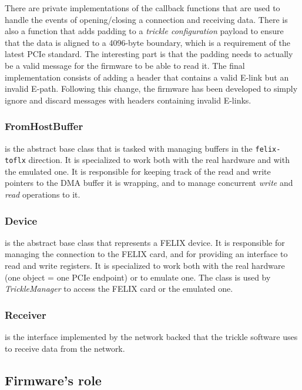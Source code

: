 There are private implementations of the callback functions that are used to handle the events of opening/closing a connection and receiving data. There is also a function that adds padding to a \emph{trickle configuration} payload to ensure that the data is aligned to a 4096-byte boundary, which is a requirement of the latest \acs{PCIe} standard. The interesting part is that the padding needs to actually be a valid message for the firmware to be able to read it. The final implementation consists of adding a header that contains a valid \acs{E-link} but an invalid E-path. Following this change, the firmware has been developed to simply ignore and discard messages with headers containing invalid \acs{E-link}s.

\subsubsection{FromHostBuffer} is the abstract base class that is tasked with managing buffers in the \texttt{felix-toflx} direction. It is specialized to work both with the real hardware and with the emulated one. It is responsible for keeping track of the read and write pointers to the \acs{DMA} buffer it is wrapping, and to manage concurrent \emph{write} and \emph{read} operations to it.

\subsubsection{Device} is the abstract base class that represents a \acs{FELIX} device. It is responsible for managing the connection to the \acs{FELIX} card, and for providing an interface to read and write registers. It is specialized to work both with the real hardware (one object = one \acs{PCIe} endpoint) or to emulate one. The class is used by \emph{TrickleManager} to access the \acs{FELIX} card or the emulated one.\\

\subsubsection{Receiver} \label{subsubsec:receiver} is the interface implemented by the network backed that the trickle software uses to receive data from the network.

\subsection{Firmware's role}

